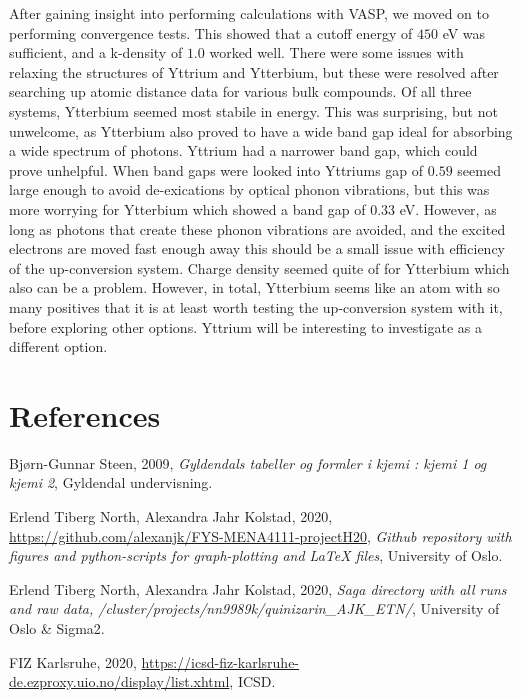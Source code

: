 \documentclass{article}
\begin{document}
  After gaining insight into performing calculations with VASP, we moved on to performing convergence tests. This showed that a cutoff energy of $450$ eV was sufficient, and a k-density of $1.0$ worked well. There were some issues with relaxing the structures of Yttrium and Ytterbium, but these were resolved after searching up atomic distance data for various bulk compounds. Of all three systems, Ytterbium seemed most stabile in energy. This was surprising, but not unwelcome, as Ytterbium also proved to have a wide band gap ideal for absorbing a wide spectrum of photons. Yttrium had a narrower band gap, which could prove unhelpful. When band gaps were looked into Yttriums gap of $0.59$ seemed large enough to avoid de-exications by optical phonon vibrations, but this was more worrying for Ytterbium which showed a band gap of $0.33$ eV. However, as long as photons that create these phonon vibrations are avoided, and the excited electrons are moved fast enough away this should be a small issue with efficiency of the up-conversion system. Charge density seemed quite of for Ytterbium which also can be a problem. However, in total, Ytterbium seems like an atom with so many positives that it is at least worth testing the up-conversion system with it, before exploring other options. Yttrium will be interesting to investigate as a different option.

\vspace{1cm}

\section{References} \label{sec:References}

    \begin{thebibliography}{}

    Bjørn-Gunnar Steen, 2009, \textit{Gyldendals tabeller og formler i kjemi : kjemi 1 og kjemi 2}, Gyldendal undervisning.

    Erlend Tiberg North, Alexandra Jahr Kolstad, 2020, \url{https://github.com/alexanjk/FYS-MENA4111-projectH20}, \textit{Github repository with figures and python-scripts for graph-plotting and LaTeX files}, University of Oslo.

    Erlend Tiberg North, Alexandra Jahr Kolstad, 2020, \textit{Saga directory with all runs and raw data, /cluster/projects/nn9989k/quinizarin\_AJK\_ETN/}, University of Oslo \& Sigma2.

     FIZ Karlsruhe, 2020, \url{https://icsd-fiz-karlsruhe-de.ezproxy.uio.no/display/list.xhtml}, ICSD.


    \end{thebibliography}
\end{document}
